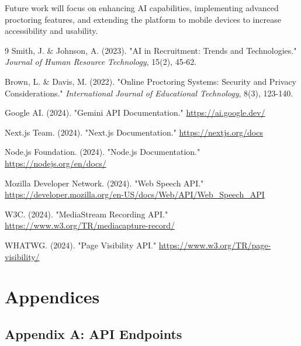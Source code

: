 \documentclass[12pt, conference]{IEEEtran}
\begin{document}
Future work will focus on enhancing AI capabilities, implementing advanced proctoring features, and extending the platform to mobile devices to increase accessibility and usability.


\begin{thebibliography}{9}
 Smith, J. \& Johnson, A. (2023). "AI in Recruitment: Trends and Technologies." \emph{Journal of Human Resource Technology}, 15(2), 45-62.

 Brown, L. \& Davis, M. (2022). "Online Proctoring Systems: Security and Privacy Considerations." \emph{International Journal of Educational Technology}, 8(3), 123-140.

 Google AI. (2024). "Gemini API Documentation." \url{https://ai.google.dev/}

 Next.js Team. (2024). "Next.js Documentation." \url{https://nextjs.org/docs}

 Node.js Foundation. (2024). "Node.js Documentation." \url{https://nodejs.org/en/docs/}

 Mozilla Developer Network. (2024). "Web Speech API." \url{https://developer.mozilla.org/en-US/docs/Web/API/Web_Speech_API}

 W3C. (2024). "MediaStream Recording API." \url{https://www.w3.org/TR/mediacapture-record/}

 WHATWG. (2024). "Page Visibility API." \url{https://www.w3.org/TR/page-visibility/}

\end{thebibliography}

\section*{Appendices}

\subsection*{Appendix A: API Endpoints}
\end{document}
